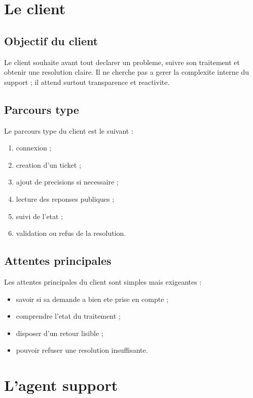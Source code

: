 \documentclass[12pt,a4paper,oneside]{report}
\begin{document}
\section{Le client}

\subsection{Objectif du client}

Le client souhaite avant tout declarer un probleme, suivre son traitement et obtenir une resolution claire. Il ne cherche pas a gerer la complexite interne du support ; il attend surtout transparence et reactivite.

\subsection{Parcours type}

Le parcours type du client est le suivant :

\begin{enumerate}[leftmargin=1.2cm]
  \item connexion ;
  \item creation d'un ticket ;
  \item ajout de precisions si necessaire ;
  \item lecture des reponses publiques ;
  \item suivi de l'etat ;
  \item validation ou refus de la resolution.
\end{enumerate}

\subsection{Attentes principales}

Les attentes principales du client sont simples mais exigeantes :

\begin{itemize}[leftmargin=1.2cm]
  \item savoir si sa demande a bien ete prise en compte ;
  \item comprendre l'etat du traitement ;
  \item disposer d'un retour lisible ;
  \item pouvoir refuser une resolution insuffisante.
\end{itemize}

\section{L'agent support}
\end{document}
